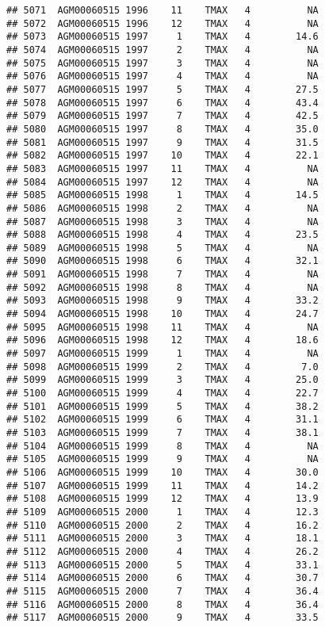 \documentclass{article}\usepackage[]{graphicx}\usepackage[]{color}
\makeatletter
\newenvironment{kframe}{%
 \def\at@end@of@kframe{}%
 \ifinner\ifhmode%
  \def\at@end@of@kframe{\end{minipage}}%
  \begin{minipage}{\columnwidth}%
 \fi\fi%
 \def\FrameCommand##1{\hskip\@totalleftmargin \hskip-\fboxsep
 \colorbox{shadecolor}{##1}\hskip-\fboxsep
     \hskip-\linewidth \hskip-\@totalleftmargin \hskip\columnwidth}%
 \MakeFramed {\advance\hsize-\width
   \@totalleftmargin\z@ \linewidth\hsize
   \@setminipage}}%
 {\par\unskip\endMakeFramed%
 \at@end@of@kframe}
\newenvironment{knitrout}{}{} %
\makeatother
\begin{document}
\begin{knitrout}
\begin{kframe}
\begin{verbatim}
## 5071  AGM00060515 1996    11    TMAX   4          NA
## 5072  AGM00060515 1996    12    TMAX   4          NA
## 5073  AGM00060515 1997     1    TMAX   4        14.6
## 5074  AGM00060515 1997     2    TMAX   4          NA
## 5075  AGM00060515 1997     3    TMAX   4          NA
## 5076  AGM00060515 1997     4    TMAX   4          NA
## 5077  AGM00060515 1997     5    TMAX   4        27.5
## 5078  AGM00060515 1997     6    TMAX   4        43.4
## 5079  AGM00060515 1997     7    TMAX   4        42.5
## 5080  AGM00060515 1997     8    TMAX   4        35.0
## 5081  AGM00060515 1997     9    TMAX   4        31.5
## 5082  AGM00060515 1997    10    TMAX   4        22.1
## 5083  AGM00060515 1997    11    TMAX   4          NA
## 5084  AGM00060515 1997    12    TMAX   4          NA
## 5085  AGM00060515 1998     1    TMAX   4        14.5
## 5086  AGM00060515 1998     2    TMAX   4          NA
## 5087  AGM00060515 1998     3    TMAX   4          NA
## 5088  AGM00060515 1998     4    TMAX   4        23.5
## 5089  AGM00060515 1998     5    TMAX   4          NA
## 5090  AGM00060515 1998     6    TMAX   4        32.1
## 5091  AGM00060515 1998     7    TMAX   4          NA
## 5092  AGM00060515 1998     8    TMAX   4          NA
## 5093  AGM00060515 1998     9    TMAX   4        33.2
## 5094  AGM00060515 1998    10    TMAX   4        24.7
## 5095  AGM00060515 1998    11    TMAX   4          NA
## 5096  AGM00060515 1998    12    TMAX   4        18.6
## 5097  AGM00060515 1999     1    TMAX   4          NA
## 5098  AGM00060515 1999     2    TMAX   4         7.0
## 5099  AGM00060515 1999     3    TMAX   4        25.0
## 5100  AGM00060515 1999     4    TMAX   4        22.7
## 5101  AGM00060515 1999     5    TMAX   4        38.2
## 5102  AGM00060515 1999     6    TMAX   4        31.1
## 5103  AGM00060515 1999     7    TMAX   4        38.1
## 5104  AGM00060515 1999     8    TMAX   4          NA
## 5105  AGM00060515 1999     9    TMAX   4          NA
## 5106  AGM00060515 1999    10    TMAX   4        30.0
## 5107  AGM00060515 1999    11    TMAX   4        14.2
## 5108  AGM00060515 1999    12    TMAX   4        13.9
## 5109  AGM00060515 2000     1    TMAX   4        12.3
## 5110  AGM00060515 2000     2    TMAX   4        16.2
## 5111  AGM00060515 2000     3    TMAX   4        18.1
## 5112  AGM00060515 2000     4    TMAX   4        26.2
## 5113  AGM00060515 2000     5    TMAX   4        33.1
## 5114  AGM00060515 2000     6    TMAX   4        30.7
## 5115  AGM00060515 2000     7    TMAX   4        36.4
## 5116  AGM00060515 2000     8    TMAX   4        36.4
## 5117  AGM00060515 2000     9    TMAX   4        33.5

\end{verbatim}
\end{kframe}
\end{knitrout}
\end{document}
